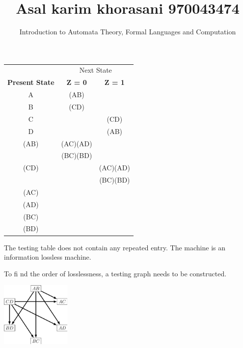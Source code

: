 \documentclass{book}
\title{Asal karim khorasani 970043474}
\author{Introduction to Automata Theory, Formal Languages and Computation}
\date{}
\begin{document}
	\maketitle
	\begin{center}
			\begin{tabular}{ccc}
		\hline
		 & \multicolumn{2}{c}{Next State}\\
		\cline{2-3}
		\textbf{Present State } & \textbf{Z = 0} & \textbf{Z = 1}\\
		\hline
		A & (AB) &\\
		B & (CD) &\\
		C & & (CD)\\
		D & & (AB)\\
		(AB) & (AC)(AD)\\
		 & (BC)(BD)\\
		 (CD) & & (AC)(AD)\\
		  & & (BC)(BD)\\
		  (AC)\\
		  (AD)\\
		  (BC)\\
		  (BD)\\
		  \hline
		
	\end{tabular}
\end{center}

	The testing table does not contain any repeated entry. The machine is an information lossless machine.
	
	
	 To ﬁ nd the order of losslessness, a testing graph needs to be constructed.
	 
	 \begin{center}
	 	\includegraphics[height=120]{Screenshot .jpg}
	 \end{center}
 
\end{document}
